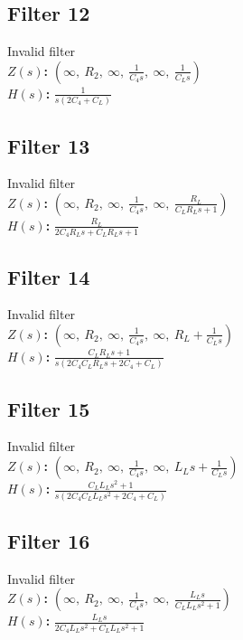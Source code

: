 \documentclass{article}
\begin{document}
\subsection*{Filter 12}
Invalid filter \\ 
\textbf{$Z(s)$:} $\left( \infty, \  R_{2}, \  \infty, \  \frac{1}{C_{4} s}, \  \infty, \  \frac{1}{C_{L} s}\right)$ \\ 
\textbf{$H(s)$:} $\frac{1}{s \left(2 C_{4} + C_{L}\right)}$ \\ 
\subsection*{Filter 13}
Invalid filter \\ 
\textbf{$Z(s)$:} $\left( \infty, \  R_{2}, \  \infty, \  \frac{1}{C_{4} s}, \  \infty, \  \frac{R_{L}}{C_{L} R_{L} s + 1}\right)$ \\ 
\textbf{$H(s)$:} $\frac{R_{L}}{2 C_{4} R_{L} s + C_{L} R_{L} s + 1}$ \\ 
\subsection*{Filter 14}
Invalid filter \\ 
\textbf{$Z(s)$:} $\left( \infty, \  R_{2}, \  \infty, \  \frac{1}{C_{4} s}, \  \infty, \  R_{L} + \frac{1}{C_{L} s}\right)$ \\ 
\textbf{$H(s)$:} $\frac{C_{L} R_{L} s + 1}{s \left(2 C_{4} C_{L} R_{L} s + 2 C_{4} + C_{L}\right)}$ \\ 
\subsection*{Filter 15}
Invalid filter \\ 
\textbf{$Z(s)$:} $\left( \infty, \  R_{2}, \  \infty, \  \frac{1}{C_{4} s}, \  \infty, \  L_{L} s + \frac{1}{C_{L} s}\right)$ \\ 
\textbf{$H(s)$:} $\frac{C_{L} L_{L} s^{2} + 1}{s \left(2 C_{4} C_{L} L_{L} s^{2} + 2 C_{4} + C_{L}\right)}$ \\ 
\subsection*{Filter 16}
Invalid filter \\ 
\textbf{$Z(s)$:} $\left( \infty, \  R_{2}, \  \infty, \  \frac{1}{C_{4} s}, \  \infty, \  \frac{L_{L} s}{C_{L} L_{L} s^{2} + 1}\right)$ \\ 
\textbf{$H(s)$:} $\frac{L_{L} s}{2 C_{4} L_{L} s^{2} + C_{L} L_{L} s^{2} + 1}$ \\ 
\end{document}

